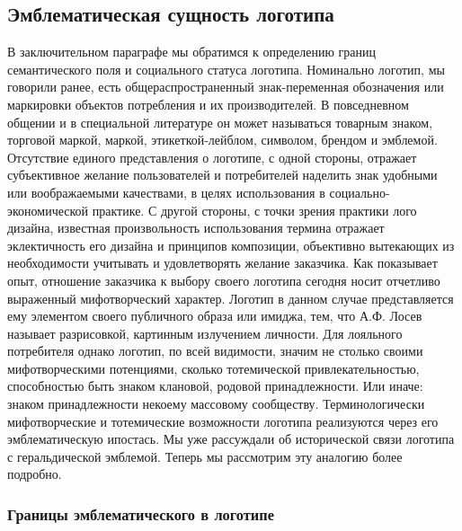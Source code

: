 \subsection{Эмблематическая сущность логотипа}

В заключительном параграфе мы обратимся к определению границ семантического поля и социального
статуса логотипа. Номинально логотип, мы говорили ранее, есть общераспространенный знак-переменная
обозначения или маркировки объектов потребления и их производителей. В повседневном общении и в
специальной литературе он может называться товарным знаком, торговой маркой, маркой,
этикеткой-лейблом, символом, брендом и эмблемой.  Отсутствие единого представления о логотипе, с
одной стороны, отражает  субъективное желание пользователей и потребителей наделить знак удобными
или воображаемыми качествами, в целях использования в социально-экономической практике. С другой
стороны, с точки зрения практики лого дизайна, известная произвольность  использования термина
отражает  эклектичность его дизайна и принципов композиции, объективно вытекающих из необходимости
учитывать и удовлетворять желание заказчика. Как показывает опыт, отношение заказчика к выбору
своего логотипа сегодня носит отчетливо выраженный мифотворческий характер. Логотип в данном случае
представляется ему элементом  своего публичного образа или имиджа, тем, что А.Ф. Лосев называет
разрисовкой, картинным излучением личности. \autocite[][94]{losev1991} Для лояльного потребителя
однако логотип, по всей видимости, значим не столько своими мифотворческими потенциями, сколько
тотемической привлекательностью, способностью быть знаком клановой, родовой
принадлежности. Или иначе: знаком принадлежности некоему массовому сообществу. Терминологически
мифотворческие и тотемические возможности логотипа реализуются через его эмблематическую ипостась.
Мы уже рассуждали об исторической связи логотипа с геральдической эмблемой.  Теперь мы рассмотрим
эту аналогию более подробно.

\subsubsection{Границы эмблематического в логотипе}

